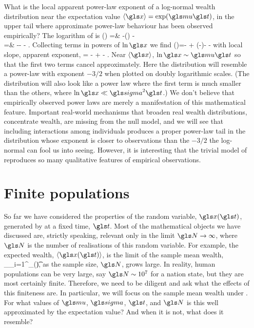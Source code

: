 What is the local apparent power-law exponent of a log-normal wealth distribution near the 
expectation value $\ave{\x}=\exp(\gmu \t)$, \ie in the upper tail where approximate power-law behaviour
has been observed empirically? The logarithm of  is
\bea
\ln \PDF(\x) =& -\ln\left(\x{}\right) -\\
=& -\ln \x - - .
\eea
Collecting terms in powers of $\ln \x$ we find
\be
\ln \PDF(\x)=-  + \left(-\right)\ln \x - -
\ee
with local slope, \ie apparent exponent,
\be
\frac{\gd\ln \PDF(\x)}{\gd \ln \x} = - \frac{\ln \x}{\gsigma^2 \t}  +  - .
\ee
Near $\ave{\x}$, $\ln \x \sim \gmu \t$ so that the first two terms cancel approximately. Here the distribution will resemble a power-law with exponent $-3/2$ when plotted on doubly logarithmic scales. (The distribution will also look like a power law where the first term is much smaller than the others, \eg where $\ln \x \ll \gsigma^2 \t$.) We don't believe that empirically observed power laws are merely a manifestation of this mathematical feature. Important real-world  mechanisms that broaden real wealth distributions, \ie concentrate wealth, are missing from the null model, and we will see that including interactions among individuals produces a proper power-law tail in the distribution whose exponent is closer to observations than the $-3/2$ the log-normal can fool us into seeing. However, it is interesting that the trivial model of \GBM reproduces so many qualitative features of empirical observations. 


\section{Finite populations}
So far we have considered the properties of the random variable, $\x(\t)$, generated by \GBM at a fixed time, $\t$. Most of the mathematical objects we have discussed are, strictly speaking, relevant only in the limit $\N\to\infty$, where $\N$ is the number of realisations of this random variable. For example, the expected wealth, $\ave{\x(\t)}$, is the limit of the sample mean wealth,
\be
\ave{\x(\t)}_\N \equiv {}\sum_{i=1}^\N \x_\gi(\t),
\ee
as the sample size, $\N$, grows large. In reality, human populations can be very large, say $\N\sim10^7$ for a nation state, but they are most certainly finite. Therefore, we need to be diligent and ask what the effects of this finiteness are. In particular, we will focus on the sample mean wealth under \GBM. For what values of $\gmu$, $\gsigma$, $\t$, and $\N$ is this well approximated by the expectation value? And when it is not, what does it resemble?

